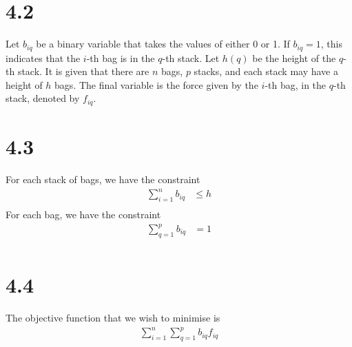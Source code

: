 \documentclass[a4paper,11pt]{article}
\newcommand{\ds}{\displaystyle}
\begin{document}
\section{4.2}
Let $\ds{b_{iq}}$ be a binary variable that takes the values of either 0 or 1. If $\ds{b_{iq} = 1}$, this indicates that the $\ds{i}$-th bag is in the $\ds{q}$-th stack. Let $\ds{h(q)}$ be the height of the $\ds{q}$-th stack. It is given that there are $\ds{n}$ bags, $\ds{p}$ stacks, and each stack may have a height of $\ds{h}$ bags. The final variable is the force given by the $\ds{i}$-th bag, in the $\ds{q}$-th stack, denoted by $\ds{f_{iq}}$.

\section{4.3}
For each stack of bags, we have the constraint
\begin{align*}
	\sum^{n}_{i=1} b_{iq} & \leq h \\
\end{align*}
For each bag, we have the constraint
\begin{align*}
	\sum^{p}_{q=1} b_{iq} & = 1\\
\end{align*}

\section{4.4}
The objective function that we wish to minimise is 
\begin{align*}
	\sum^{n}_{i=1} \sum^{p}_{q=1} b_{iq} f_{iq}\\
\end{align*}
\end{document}
